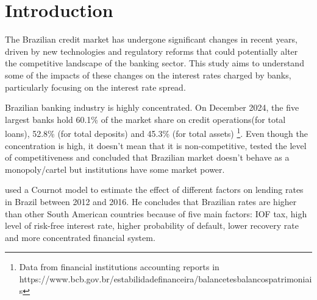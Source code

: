 \chapter{Introduction}
The Brazilian credit market has undergone significant changes in recent years, driven by new technologies and regulatory reforms that could potentially alter the competitive landscape of the banking sector. This study aims to understand some of the impacts of these changes on the interest rates charged by banks, particularly focusing on the interest rate spread. 

Brazilian banking industry is highly concentrated. On December 2024, the five largest banks hold 60.1\% of the market share on credit operations(for total loans), 52.8\% (for total deposits) and 45.3\% (for total assets) \footnote{Data from financial institutions accounting reports in \\ https://www.bcb.gov.br/estabilidadefinanceira/balancetesbalancospatrimoniais}. Even though the concentration is high, it doesn't mean that it is non-competitive,  tested the level of competitiveness and concluded that Brazilian market doesn't behave as a monopoly/cartel but institutions have some market power.

 used a Cournot model to estimate the effect of different factors on lending rates in Brazil between 2012 and 2016. He concludes that Brazilian rates are higher than other South American countries because of five main factors: IOF tax, high level of risk-free interest rate, higher probability of default, lower recovery rate and more concentrated financial system.
